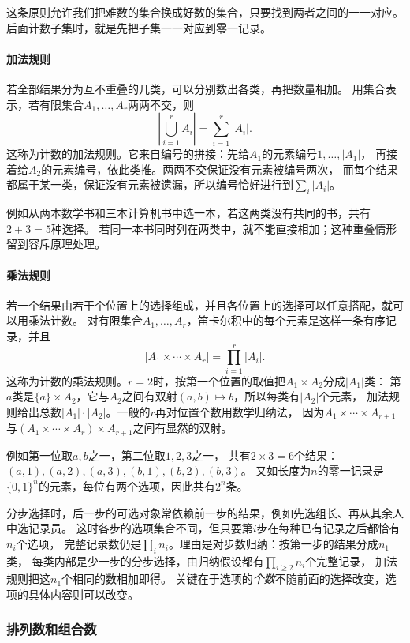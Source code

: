 这条原则允许我们把难数的集合换成好数的集合，只要找到两者之间的一一对应。
后面计数子集时，就是先把子集一一对应到零一记录。

\paragraph{加法规则}
若全部结果分为互不重叠的几类，可以分别数出各类，再把数量相加。
用集合表示，若有限集合$A_1,\ldots,A_r$两两不交，则
\[
 \left|\bigcup_{i=1}^r A_i\right|=\sum_{i=1}^r|A_i|.
\]
这称为计数的加法规则。它来自编号的拼接：先给$A_1$的元素编号$1,\ldots,|A_1|$，
再接着给$A_2$的元素编号，依此类推。两两不交保证没有元素被编号两次，
而每个结果都属于某一类，保证没有元素被遗漏，所以编号恰好进行到$\sum_i|A_i|$。

例如从两本数学书和三本计算机书中选一本，若这两类没有共同的书，共有$2+3=5$种选择。
若同一本书同时列在两类中，就不能直接相加；这种重叠情形留到容斥原理处理。

\paragraph{乘法规则}
\label{sec:comb-stepwise-counting}
若一个结果由若干个位置上的选择组成，并且各位置上的选择可以任意搭配，就可以用乘法计数。
对有限集合$A_1,\ldots,A_r$，笛卡尔积中的每个元素是这样一条有序记录，并且
\[
 |A_1\times\cdots\times A_r|=\prod_{i=1}^r|A_i|.
\]
这称为计数的乘法规则。$r=2$时，按第一个位置的取值把$A_1\times A_2$分成$|A_1|$类：
第$a$类是$\{a\}\times A_2$，它与$A_2$之间有双射$(a,b)\mapsto b$，所以每类有$|A_2|$个元素，
加法规则给出总数$|A_1|\cdot|A_2|$。一般的$r$再对位置个数用数学归纳法，
因为$A_1\times\cdots\times A_{r+1}$与$(A_1\times\cdots\times A_r)\times A_{r+1}$之间有显然的双射。

例如第一位取$a,b$之一，第二位取$1,2,3$之一，
共有$2\times3=6$个结果：$(a,1),(a,2),(a,3),(b,1),(b,2),(b,3)$。
又如长度为$n$的零一记录是$\{0,1\}^n$的元素，每位有两个选项，因此共有$2^n$条。

分步选择时，后一步的可选对象常依赖前一步的结果，例如先选组长、再从其余人中选记录员。
这时各步的选项集合不同，但只要第$i$步在每种已有记录之后都恰有$n_i$个选项，
完整记录数仍是$\prod_i n_i$。理由是对步数归纳：按第一步的结果分成$n_1$类，
每类内部是少一步的分步选择，由归纳假设都有$\prod_{i\geq2}n_i$个完整记录，
加法规则把这$n_1$个相同的数相加即得。
关键在于选项的\emph{个数}不随前面的选择改变，选项的具体内容则可以改变。

\subsubsection{排列数和组合数}
\label{sec:comb-permutation-combination-counts}

